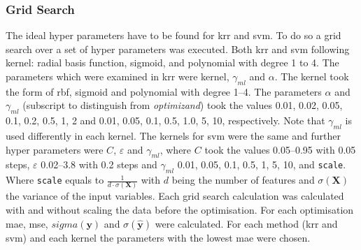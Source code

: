 %


\subsubsection{Grid Search}
The ideal hyper parameters have to be found for \gls{krr} and \gls{svm}.
To do so a grid search over a set of hyper parameters was executed. 
Both \gls{krr} and \gls{svm} following kernel: radial basis function, sigmoid, and polynomial with degree 1 to 4. 
%
%
The parameters which were examined in \gls{krr} were kernel, $\gamma_{ml}$ and $\alpha$.
The kernel took the form of \gls{rbf}, sigmoid and polynomial with degree 1--4.
The parameters $\alpha$ and $\gamma_{ml}$ (subscript to distinguish from \textit{optimizand}) took the values 0.01, 0.02, 0.05, 0.1, 0.2, 0.5, 1, 2
and 0.01, 0.05, 0.1, 0.5, 1.0, 5, 10, respectively.
Note that $\gamma_{ml}$ is used differently in each kernel. 
The kernels for \gls{svm} were the same and further hyper parameters were 
$C$, $\varepsilon$ and $\gamma_{ml}$, where $C$ took the values 0.05--0.95 with 0.05 steps, $\varepsilon$ 0.02--3.8 with 0.2 steps and $\gamma_{ml}$ 0.01, 0.05, 0.1, 0.5, 1, 5, 10, and \texttt{scale}. 
Where \texttt{scale} equals to $\frac{1}{d \cdot \sigma(\mathbf{X})}$ with $d$ being the number of features 
and $\sigma(\mathbf{X})$ the variance of the input variables. 
%
Each grid search calculation was calculated with and without scaling the data before the optimisation. 
For each optimisation \gls{mae}, \gls{mse}, $sigma(\mathbf{y})$ and $\sigma(\mathbf{\hat{y}})$ were calculated. 
For each method (\gls{krr} and \gls{svm}) and each kernel the parameters with the lowest \gls{mae} were chosen. 
%



